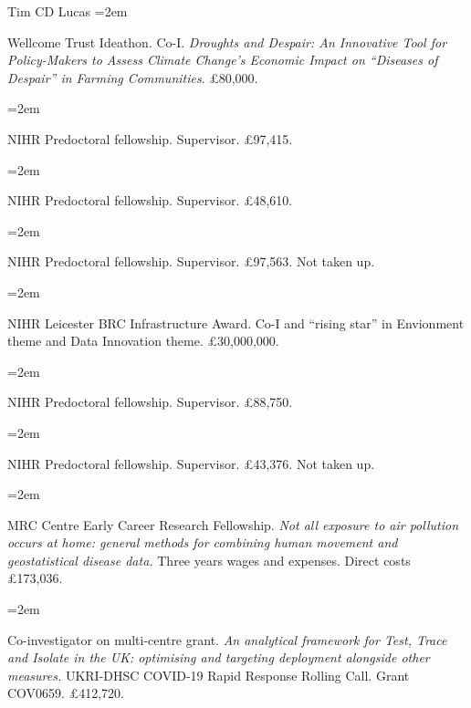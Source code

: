 \documentclass{scrartcl}
\newcommand{\MarginText}[1]{\marginpar{\raggedleft\itshape\small#1}} %
\newcommand{\Description}[1]{\hangindent=2em\hangafter=0\noindent\raggedright\footnotesize{#1}\par\normalsize\vspace{1em}} %
\begin{document}
\begin{cv}{Tim {\Large CD} Lucas}
\Description{Wellcome Trust Ideathon. Co-I. \emph{Droughts and Despair: An Innovative Tool for Policy-Makers to Assess Climate Change's Economic Impact on ``Diseases of Despair'' in Farming Communities}. £80,000.}
\vspace{-0.5em} %

\Description{NIHR Predoctoral fellowship. Supervisor. £97,415.}
\vspace{-0.5em} %

\Description{NIHR Predoctoral fellowship. Supervisor. £48,610.}
\vspace{-0.5em} %

\Description{NIHR Predoctoral fellowship. Supervisor. £97,563. Not taken up.}
\vspace{-0.5em} %

\Description{\MarginText{2022}NIHR Leicester BRC Infrastructure Award. Co-I and ``rising star'' in Envionment theme and Data Innovation theme. £30,000,000.}
\vspace{-0.5em} %


\Description{NIHR Predoctoral fellowship. Supervisor. £88,750.}
\vspace{-0.5em} %

\Description{NIHR Predoctoral fellowship. Supervisor. £43,376. Not taken up.}
\vspace{-0.5em} %


\Description{\MarginText{2020}MRC Centre Early Career Research Fellowship. \emph{Not all exposure to air pollution occurs at home: general methods for combining human movement and geostatistical disease data.} Three years wages and expenses. Direct costs £173,036.}
\vspace{-0.5em} %


\Description{Co-investigator on multi-centre grant. \emph{An analytical framework for Test, Trace and Isolate in the UK: optimising and targeting deployment alongside other measures.} UKRI-DHSC COVID-19 Rapid Response Rolling Call. Grant COV0659. £412,720.}
\vspace{-0.5em} %




\end{cv}
\end{document}
